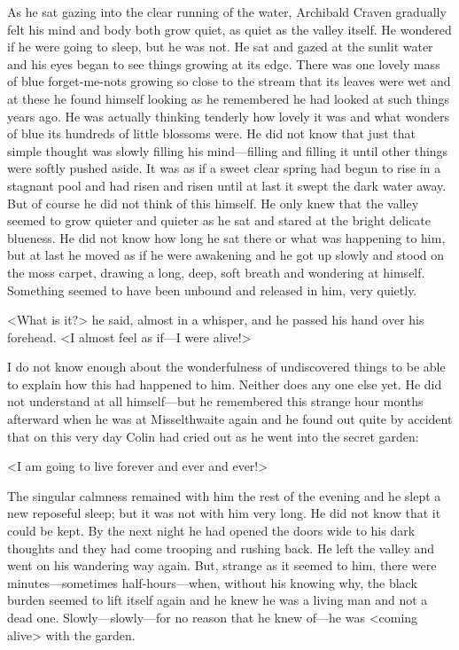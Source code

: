 As he sat gazing into the clear running of the water, Archibald Craven gradually felt his mind and body both grow quiet, as quiet as the valley itself. He wondered if he were going to sleep, but he was not. He sat and gazed at the sunlit water and his eyes began to see things growing at its edge. There was one lovely mass of blue forget-me-nots growing so close to the stream that its leaves were wet and at these he found himself looking as he remembered he had looked at such things years ago. He was actually thinking tenderly how lovely it was and what wonders of blue its hundreds of little blossoms were. He did not know that just that simple thought was slowly filling his mind—filling and filling it until other things were softly pushed aside. It was as if a sweet clear spring had begun to rise in a stagnant pool and had risen and risen until at last it swept the dark water away. But of course he did not think of this himself. He only knew that the valley seemed to grow quieter and quieter as he sat and stared at the bright delicate blueness. He did not know how long he sat there or what was happening to him, but at last he moved as if he were awakening and he got up slowly and stood on the moss carpet, drawing a long, deep, soft breath and wondering at himself. Something seemed to have been unbound and released in him, very quietly.

<What is it?> he said, almost in a whisper, and he passed his hand over his forehead. <I almost feel as if—I were alive!>

I do not know enough about the wonderfulness of undiscovered things to be able to explain how this had happened to him. Neither does any one else yet. He did not understand at all himself—but he remembered this strange hour months afterward when he was at Misselthwaite again and he found out quite by accident that on this very day Colin had cried out as he went into the secret garden:

<I am going to live forever and ever and ever!>

The singular calmness remained with him the rest of the evening and he slept a new reposeful sleep; but it was not with him very long. He did not know that it could be kept. By the next night he had opened the doors wide to his dark thoughts and they had come trooping and rushing back. He left the valley and went on his wandering way again. But, strange as it seemed to him, there were minutes—sometimes half-hours—when, without his knowing why, the black burden seemed to lift itself again and he knew he was a living man and not a dead one. Slowly—slowly—for no reason that he knew of—he was <coming alive> with the garden.

